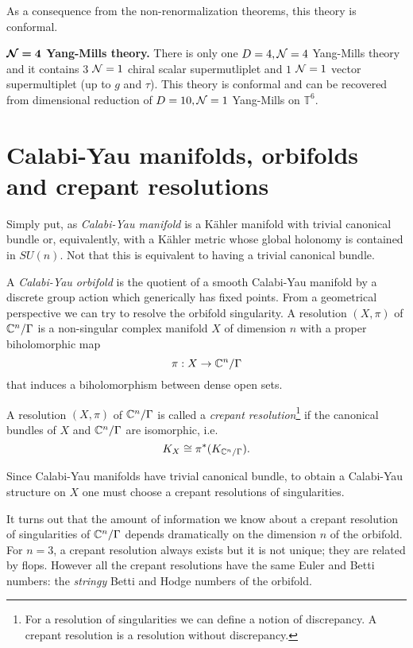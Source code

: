 \documentclass[a4paper,11pt]{article}
\begin{document}
    As a consequence from the non-renormalization theorems, this theory is conformal.

    \begin{result}
        \textbf{$\boldsymbol{\mathcal{N}=4}$ Yang-Mills theory.} There is only one $D=4,\mathcal{N}=4$ Yang-Mills theory and it contains $3$ $\mathcal{N}=1$ chiral scalar supermutliplet and $1$ $\mathcal{N}=1$ vector supermultiplet (up to $g$ and $\tau$). This theory is conformal and can be recovered from dimensional reduction of $D=10,\mathcal{N}=1$ Yang-Mills on $\mathbb{T}^6$.
    \end{result}



\section{Calabi-Yau manifolds, orbifolds and crepant resolutions}

    Simply put, as \emph{Calabi-Yau manifold} is a Kähler manifold with trivial canonical bundle or, equivalently, with a Kähler metric whose global holonomy is contained in $SU(n)$. Not that this is equivalent to having a trivial canonical bundle.

     A \emph{Calabi-Yau orbifold} is the quotient of a smooth Calabi-Yau manifold by a discrete group action which generically has fixed points. From a geometrical perspective we can try to resolve the orbifold singularity. A resolution $(X,\pi)$ of $\mathbb{C}^n/\Gamma$ is a non-singular complex manifold $X$ of dimension $n$ with a proper biholomorphic map 
    \begin{equation}
        \pi:X\to\mathbb{C}^n/\Gamma
    \end{equation}
    that induces a biholomorphism between dense open sets. 
    \begin{defn}
        A resolution $(X,\pi)$ of $\mathbb{C}^n/\Gamma$ is called a \emph{crepant resolution}\footnote{For a resolution of singularities we can define a notion of discrepancy. A crepant resolution is a resolution
        without discrepancy.} if the canonical bundles of $X$ and $\mathbb{C}^n/\Gamma$ are isomorphic, i.e.
        \begin{equation*}
            K_X\cong\pi^*(K_{\mathbb{C}^n/\Gamma}).
        \end{equation*}
    \end{defn}
    Since Calabi-Yau manifolds have trivial canonical bundle, to obtain a Calabi-Yau structure on $X$ one must choose a crepant resolutions of singularities.

    It turns out that the amount of information we know about a crepant resolution of singularities of $\mathbb{C}^n/\Gamma$ depends dramatically on the dimension $n$ of the orbifold. For $n=3$, a crepant resolution always exists but it is not unique; they are related by flops. However all the crepant resolutions have the same Euler and Betti numbers: the \emph{stringy} Betti and Hodge numbers of the orbifold.

\pagebreak

\listofmarker
{}

\pagebreak

\printbibliography
\end{document}
